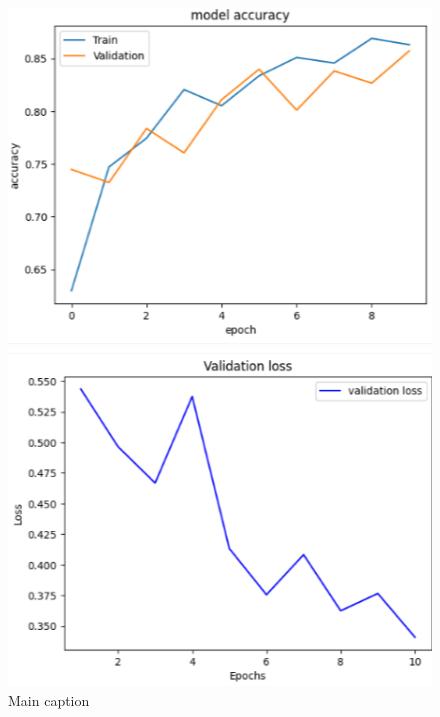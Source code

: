 \begin{figure}[ht]
  \centering
  \begin{minipage}[b]{0.4\linewidth}
    \centering
    \includegraphics[width=\linewidth]{Chapters/Chapter_5/figures/model_accurecy.png}
  \end{minipage}
  \hfill
  \begin{minipage}[b]{0.4\linewidth}
    \centering
    \includegraphics[width=\linewidth]{Chapters/Chapter_5/figures/validationloss.png}
  \end{minipage}
  \caption{Main caption}
  \label{fig:figure5_3}
  \end{figure}
  

